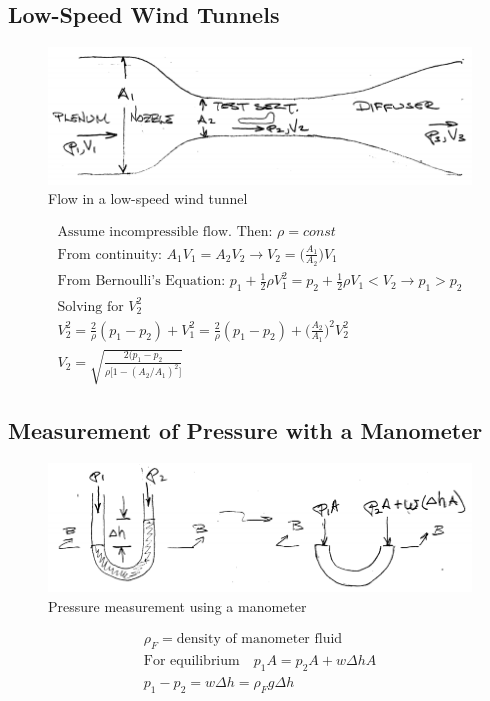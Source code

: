 \documentclass[draft=false, titlepage]{article}
\begin{document}
\subsection{Low-Speed Wind Tunnels}
\begin{figure}[ht]
	\centering
	\includegraphics[width=0.7\linewidth]{Figures/p9_lowSpeedWindTunnel.PNG}
	\caption{Flow in a low-speed wind tunnel}
	\label{fig:p9_lowSpeedWindTunnel}
\end{figure}

\begin{gather*}
\text{Assume incompressible flow. Then: } \rho = const\\
\text{From continuity: } A_1V_1 = A_2V_2 \rightarrow V_2 = \big(\frac{A_1}{A_2}\big)V_1\\
\text{From Bernoulli's Equation: } p_1 + \frac{1}{2}\rho V_1^2 = p_2 + \frac{1}{2}\rho %
V_1 < V_2 \rightarrow p_1 > p_2\\
\text{Solving for } V_2^2\\
V_2^2 = \frac{2}{\rho}(p_1-p_2) + V_1^2 = \frac{2}{\rho} (p_1-p_2) + \big(\frac{A_2}{A_1}\big)^2 V_2^2\\
\boxed{V_2 = \sqrt{\frac{2(p_1-p_2}{\rho\big[ 1-(A_2/A_1)^2 \big]}}}
\end{gather*}

\subsection{Measurement of Pressure with a Manometer}
\begin{figure}[ht]
	\centering
	\includegraphics[width=0.7\linewidth]{Figures/p10_manometers.PNG}
	\caption{Pressure measurement using a manometer}
	\label{fig:p10_manometers}
\end{figure}
\begin{gather*}
\rho_F = \text{density of manometer fluid}\\
\text{For equilibrium} \quad p_1A = p_2A + w\Delta h A\\
\boxed{p_1-p_2 = w\Delta h = \rho_F g \Delta h}
\end{gather*}
\end{document}
